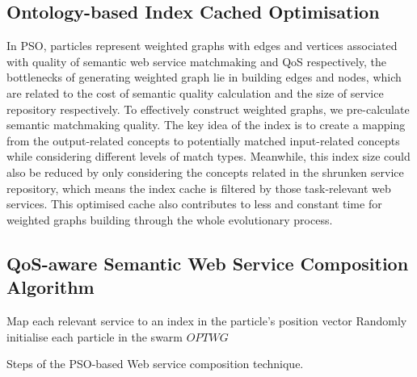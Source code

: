 \documentclass{IEEEtran}
\begin{document}
\subsection{Ontology-based Index Cached Optimisation}\label{indexCache}
In PSO, particles represent weighted graphs with edges and vertices associated with quality of semantic web service matchmaking and QoS respectively, the bottlenecks of generating weighted graph lie in building edges and nodes, which are related to the cost of semantic quality calculation and the size of service repository respectively. To effectively construct weighted graphs, we pre-calculate semantic matchmaking quality. The key idea of the index is to create a mapping from the output-related concepts to potentially matched input-related concepts while considering different levels of match types. Meanwhile, this index size could also be reduced by only considering the concepts related in the shrunken service repository, which means the index cache is filtered by those task-relevant web services. This optimised cache also contributes to less and constant time for weighted graphs building through the whole evolutionary process.


\subsection{QoS-aware Semantic Web Service Composition Algorithm} \label{pso_algorithm}


\begin{algorithm}
 \setlength{}
 \LinesNumbered
 \SetNlSty{}{}{:}
 Map each relevant service to an index in the particle's position vector\;
 Randomly initialise each particle in the swarm\;
 \KwRet $OPTWG$\;
 \caption{Steps of the PSO-based Web service composition technique.}
\label{novelSteps}
\end{algorithm} 
\end{document}
